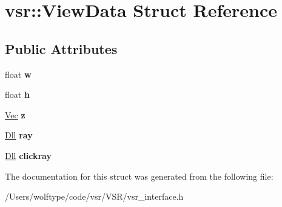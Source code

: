\hypertarget{structvsr_1_1_view_data}{\section{vsr\-:\-:View\-Data Struct Reference}
\label{structvsr_1_1_view_data}
}
\subsection*{Public Attributes}
\begin{DoxyCompactItemize}
\item 
\hypertarget{structvsr_1_1_view_data_a3973a0e926d1a15457f7e8d6f73927f0}{float {\bfseries w}}\label{structvsr_1_1_view_data_a3973a0e926d1a15457f7e8d6f73927f0}

\item 
\hypertarget{structvsr_1_1_view_data_ab21ad82bf4c92786a1019ff6eb167b1e}{float {\bfseries h}}\label{structvsr_1_1_view_data_ab21ad82bf4c92786a1019ff6eb167b1e}

\item 
\hypertarget{structvsr_1_1_view_data_add2ee7be5888dc64e560fa4dfa6bedbe}{\hyperlink{namespacevsr_a0d061c30ac198a710a1b92dd8b343273}{Vec} {\bfseries z}}\label{structvsr_1_1_view_data_add2ee7be5888dc64e560fa4dfa6bedbe}

\item 
\hypertarget{structvsr_1_1_view_data_a490c61caec6826af3135139ef7f66003}{\hyperlink{namespacevsr_a6c6892b7aec25cfb16492501e2e35b11}{Dll} {\bfseries ray}}\label{structvsr_1_1_view_data_a490c61caec6826af3135139ef7f66003}

\item 
\hypertarget{structvsr_1_1_view_data_a33fa5fb287fc0d4e5fa465e56d33f968}{\hyperlink{namespacevsr_a6c6892b7aec25cfb16492501e2e35b11}{Dll} {\bfseries clickray}}\label{structvsr_1_1_view_data_a33fa5fb287fc0d4e5fa465e56d33f968}

\end{DoxyCompactItemize}


The documentation for this struct was generated from the following file\-:\begin{DoxyCompactItemize}
\item 
/\-Users/wolftype/code/vsr/\-V\-S\-R/vsr\-\_\-interface.\-h\end{DoxyCompactItemize}
